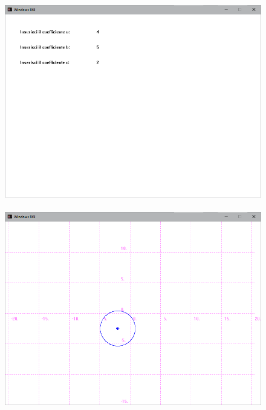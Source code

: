 \documentclass[12pt]{book}
\begin{document}
		
		\begin{figure}[h]
			\includegraphics[scale=0.5]{tracciacerchioterminale1}
	\\ \\ 
			\includegraphics[scale=0.5]{tracciacerchioterminale2}
		\end{figure}
		\clearpage
		\newpage
\end{document}
